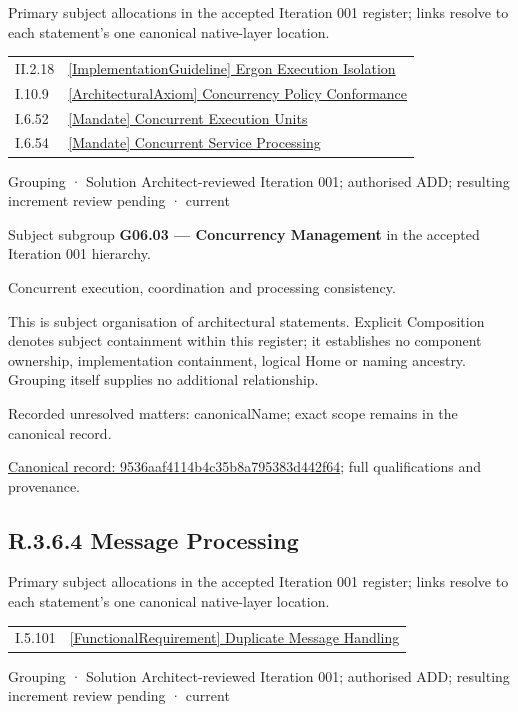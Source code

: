 Primary subject allocations in the accepted Iteration 001 register; links resolve to each statement’s one canonical native-layer location.\par
\begin{longtable}{p{.22\linewidth}p{.73\linewidth}}
II.2.18 & \hyperref[element:4332542fe3c54af9ba07220d255de9c2]{[ImplementationGuideline] Ergon Execution Isolation} \\
I.10.9 & \hyperref[element:7e3b05a2e3e547cbbd26b1e181af0d10]{[ArchitecturalAxiom] Concurrency Policy Conformance} \\
I.6.52 & \hyperref[element:12466ce2701146c1b52a9c68c2fb426c]{[Mandate] Concurrent Execution Units} \\
I.6.54 & \hyperref[element:338a4cb1c2444ec2aa7703fcd9f28247]{[Mandate] Concurrent Service Processing} \\
\end{longtable}
\label{element:9536aaf4114b4c35b8a795383d442f64}
{\small Grouping · Solution Architect-reviewed Iteration 001; authorised ADD; resulting increment review pending · current}\par

Subject subgroup \textbf{G06.03 — Concurrency Management} in the accepted Iteration 001 hierarchy.



Concurrent execution, coordination and processing consistency.



This is subject organisation of architectural statements. Explicit Composition denotes subject containment within this register; it establishes no component ownership, implementation containment, logical Home or naming ancestry. Grouping itself supplies no additional relationship.


{\small Recorded unresolved matters: canonicalName; exact scope remains in the canonical record.}\par
{\footnotesize \href{../../../../continuum/grouping/9536aaf4114b4c35b8a795383d442f64.md}{Canonical record: 9536aaf4114b4c35b8a795383d442f64}; full qualifications and provenance.}\par
\subsection*{R.3.6.4 Message Processing}
\label{navigation:R.3.6.4}

Primary subject allocations in the accepted Iteration 001 register; links resolve to each statement’s one canonical native-layer location.\par
\begin{longtable}{p{.22\linewidth}p{.73\linewidth}}
I.5.101 & \hyperref[element:76a67526fcdf40999f375a8cac54d5ef]{[FunctionalRequirement] Duplicate Message Handling} \\
\end{longtable}
\label{element:5dde6ebecd094084b325ba59603bb919}
{\small Grouping · Solution Architect-reviewed Iteration 001; authorised ADD; resulting increment review pending · current}\par

